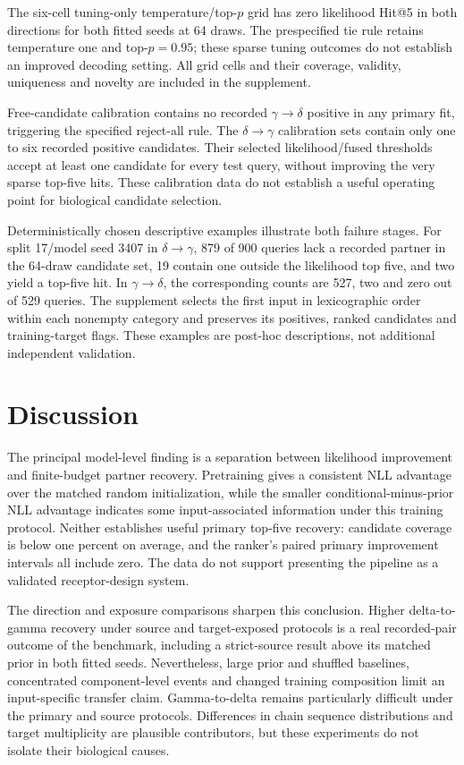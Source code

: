 \documentclass[10pt]{article}
\newcommand{\gtd}{\ensuremath{\gamma\!\rightarrow\!\delta}}
\newcommand{\dtg}{\ensuremath{\delta\!\rightarrow\!\gamma}}
\begin{document}
The six-cell tuning-only temperature/top-$p$ grid has zero likelihood Hit@5
in both directions for both fitted seeds at 64 draws. The prespecified tie
rule retains temperature one and top-$p=0.95$; these sparse tuning outcomes
do not establish an improved decoding setting. All grid cells and their
coverage, validity, uniqueness and novelty are included in the supplement.

Free-candidate calibration contains no recorded \gtd{} positive in any
primary fit, triggering the specified reject-all rule. The \dtg{} calibration
sets contain only one to six recorded positive candidates. Their selected
likelihood/fused thresholds accept at least one candidate for every test query,
without improving the very sparse top-five hits. These calibration data do not
establish a useful operating point for biological candidate selection.

Deterministically chosen descriptive examples illustrate both failure stages.
For split 17/model seed 3407 in \dtg{}, 879 of 900 queries lack a recorded
partner in the 64-draw candidate set, 19 contain one outside the likelihood
top five, and two yield a top-five hit. In \gtd{}, the corresponding counts
are 527, two and zero out of 529 queries. The supplement selects the first
input in lexicographic order within each nonempty category and preserves its
positives, ranked candidates and training-target flags. These examples are
post-hoc descriptions, not additional independent validation.

\section{Discussion}
The principal model-level finding is a separation between likelihood improvement
and finite-budget partner recovery. Pretraining gives a consistent NLL advantage
over the matched random initialization, while the smaller conditional-minus-prior
NLL advantage indicates some input-associated information under this training
protocol. Neither establishes useful primary top-five recovery: candidate
coverage is below one percent on average, and the ranker's paired primary
improvement intervals all include zero. The data do not support presenting the
pipeline as a validated receptor-design system.

The direction and exposure comparisons sharpen this conclusion. Higher
delta-to-gamma recovery under source and target-exposed protocols is a real
recorded-pair outcome of the benchmark, including a strict-source result above
its matched prior in both fitted seeds. Nevertheless, large prior and shuffled
baselines, concentrated component-level events and changed training composition
limit an input-specific transfer claim. Gamma-to-delta remains particularly
difficult under the primary and source protocols. Differences in chain sequence
distributions and target multiplicity are plausible contributors, but these
experiments do not isolate their biological causes.
\end{document}
